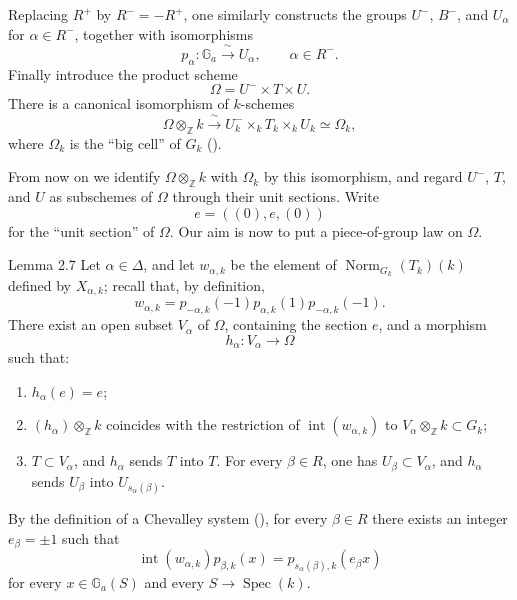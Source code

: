 
Replacing \(R^+\) by \(R^-=-R^+\), one similarly constructs the groups
\(U^-\), \(B^-\), and \(U_\alpha\) for \(\alpha\in R^-\), together with
isomorphisms
\[
 p_\alpha\colon\mathbb G_a\xrightarrow{\ \sim\ }U_\alpha,
 \qquad \alpha\in R^-.
\]
Finally introduce the product scheme
\[
 \Omega=U^-\times T\times U.
\]
There is a canonical isomorphism of \(k\)-schemes
\[
 \Omega\otimes_{\mathbb Z}k
 \xrightarrow{\ \sim\ }
 U^-_k\times_kT_k\times_kU_k
 \simeq\Omega_k,
\]
where \(\Omega_k\) is the ``big cell'' of \(G_k\) ().

From now on we identify \(\Omega\otimes_{\mathbb Z}k\) with \(\Omega_k\)
by this isomorphism, and regard \(U^-\), \(T\), and \(U\) as subschemes
of \(\Omega\) through their unit sections. Write
\[
 e=((0),e,(0))
\]
for the ``unit section'' of \(\Omega\). Our aim is now to put a
piece-of-group law on \(\Omega\).

\begin{sgastatement}{Lemma 2.7}
Let \(\alpha\in\Delta\), and let \(w_{\alpha,k}\) be the element of
\(\operatorname{Norm}_{G_k}(T_k)(k)\) defined by \(X_{\alpha,k}\); recall
that, by definition,
\[
 w_{\alpha,k}
 =p_{-\alpha,k}(-1)p_{\alpha,k}(1)p_{-\alpha,k}(-1).
\]
There exist an open subset \(V_\alpha\) of \(\Omega\), containing the
section \(e\), and a morphism
\[
 h_\alpha\colon V_\alpha\longrightarrow\Omega
\]
such that:
\begin{enumerate}[label=\textup{(\roman*)},leftmargin=2.2em]
\item \(h_\alpha(e)=e\);
\item \((h_\alpha)\otimes_{\mathbb Z}k\) coincides with the restriction
of \(\operatorname{int}(w_{\alpha,k})\) to
\(V_\alpha\otimes_{\mathbb Z}k\subset G_k\);
\item \(T\subset V_\alpha\), and \(h_\alpha\) sends \(T\) into \(T\).
For every \(\beta\in R\), one has \(U_\beta\subset V_\alpha\), and
\(h_\alpha\) sends \(U_\beta\) into \(U_{s_\alpha(\beta)}\).
\end{enumerate}
\end{sgastatement}

By the definition of a Chevalley system (), for every
\(\beta\in R\) there exists an integer \(e_\beta=\pm1\) such that
\[
 \operatorname{int}(w_{\alpha,k})p_{\beta,k}(x)
 =p_{s_\alpha(\beta),k}(e_\beta x)
\]
for every \(x\in\mathbb G_a(S)\) and every \(S\to\operatorname{Spec}(k)\).

